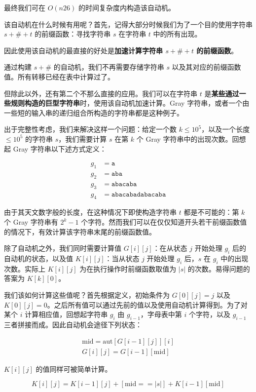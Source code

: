 最终我们可在 $O(n 26)$ 的时间复杂度内构造该自动机。

该自动机在什么时候有用呢？首先，记得大部分时候我们为了一个目的使用字符串 $s + \# + t$ 的前缀函数：寻找字符串 $s$ 在字符串 $t$ 中的所有出现。

因此使用该自动机的最直接的好处是\textbf{加速计算字符串 $s + \# + t$ 的前缀函数}。

通过构建 $s + \#$ 的自动机，我们不再需要存储字符串 $s$ 以及其对应的前缀函数值。所有转移已经在表中计算过了。

但除此以外，还有第二个不那么直接的应用。我们可以在字符串 $t$ 是\textbf{某些通过一些规则构造的巨型字符串}时，使用该自动机加速计算。Gray 字符串，或者一个由一些短的输入串的递归组合所构造的字符串都是这种例子。

出于完整性考虑，我们来解决这样一个问题：给定一个数 $k \le 10^5$，以及一个长度 $\le 10^5$ 的字符串 $s$，我们需要计算 $s$ 在第 $k$ 个 Gray 字符串中的出现次数。回想起 Gray 字符串以下述方式定义：

$$
\begin{align}
g_1 &= \mathtt{a}\\
g_2 &= \mathtt{aba}\\
g_3 &= \mathtt{abacaba}\\
g_4 &= \mathtt{abacabadabacaba}
\end{align}
$$

由于其天文数字般的长度，在这种情况下即使构造字符串 $t$ 都是不可能的：第 $k$ 个 Gray 字符串有 $2^k - 1$ 个字符。然而我们可以在仅仅知道开头若干前缀函数值的情况下，有效计算该字符串末尾的前缀函数值。

除了自动机之外，我们同时需要计算值 $G[i][j]$：在从状态 $j$ 开始处理 $g_i$ 后的自动机的状态，以及值 $K[i][j]$：当从状态 $j$ 开始处理 $g_i$ 后，$s$ 在 $g_i$ 中的出现次数。实际上 $K[i][j]$ 为在执行操作时前缀函数取值为 $|s|$ 的次数。易得问题的答案为 $K[k][0]$。

我们该如何计算这些值呢？首先根据定义，初始条件为 $G[0][j] = j$ 以及 $K[0][j] = 0$。之后所有值可以通过先前的值以及使用自动机计算得到。为了对某个 $i$ 计算相应值，回想起字符串 $g_i$ 由 $g_{i - 1}$，字母表中第 $i$ 个字符，以及 $g_{i - 1}$ 三者拼接而成。因此自动机会途径下列状态：

$$
\begin{gather}
\text{mid} = \text{aut}[G[i - 1][j]][i] \\
G[i][j] = G[i - 1][\text{mid}]
\end{gather}
$$

$K[i][j]$ 的值同样可被简单计算。

$$
K[i][j] = K[i - 1][j] + [\text{mid} == |s|] + K[i - 1][\text{mid}]
$$

